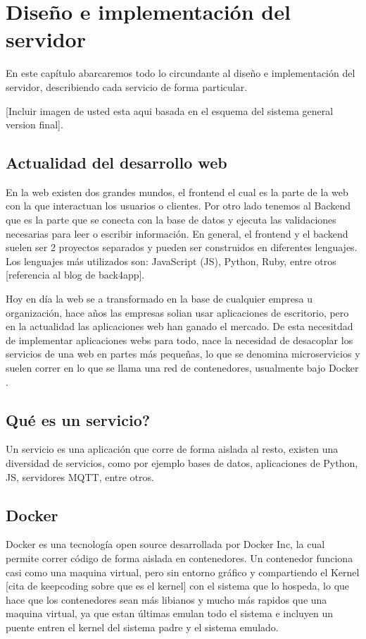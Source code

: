 \chapter{Diseño e implementación del servidor}

En este capítulo abarcaremos todo lo circundante al diseño e implementación del servidor, describiendo cada servicio de forma particular.

    [Incluir imagen de usted esta aqui basada en el esquema del sistema general version final].

\section{Actualidad del desarrollo web}

En la web existen dos grandes mundos, el frontend el cual es la parte de la web con la que interactuan los usuarios o clientes. Por otro lado tenemos al Backend que es la parte que se conecta con la base de datos y ejecuta las validaciones necesarias para leer o escribir información. En general, el frontend y el backend suelen ser 2 proyectos separados y pueden ser construidos en diferentes lenguajes. Los lenguajes más utilizados son: JavaScript (JS), Python, Ruby, entre otros [referencia al blog de back4app].

Hoy en día la web se a transformado en la base de cualquier empresa u organización, hace años las empresas solian usar aplicaciones de escritorio, pero en la actualidad las aplicaciones web han ganado el mercado.
De esta necesitdad de implementar aplicaciones webs para todo, nace la necesidad de desacoplar los servicios de una web en partes más pequeñas, lo que se denomina microservicios y suelen correr en lo que se llama una red de contenedores, usualmente bajo Docker \cite{noauthor_documentacion_2023}.
\section{Qué es un servicio?}

Un servicio es una aplicación que corre de forma aislada al resto, existen una diversidad de servicios, como por ejemplo bases de datos, aplicaciones de Python, JS, servidores MQTT, entre otros.

\section{Docker}

Docker es una tecnología open source desarrollada por Docker Inc, la cual permite correr código de forma aislada en contenedores. Un contenedor funciona casi como una maquina virtual, pero sin entorno gráfico y compartiendo el Kernel [cita de keepcoding sobre que es el kernel] con el sistema que lo hospeda, lo que hace que los contenedores sean más libianos y mucho más rapidos que una maquina virtual, ya que estan últimas emulan todo el sistema e incluyen un puente entren el kernel del sistema padre y el sistema emulado.

